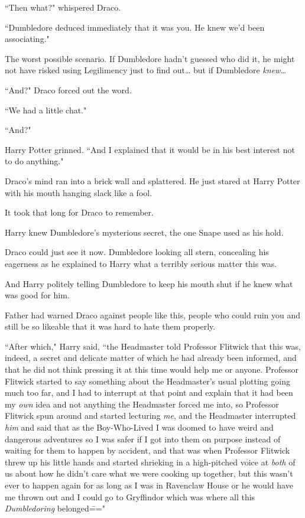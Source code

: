 ``Then what?" whispered Draco.

``Dumbledore deduced immediately that it was you. He knew we'd been associating."

The worst possible scenario. If Dumbledore hadn't guessed who did it, he might not have risked using Legilimency just to find out{\ldots} but if Dumbledore \emph{knew{\ldots}}

``And?" Draco forced out the word.

``We had a little chat."

``And?"

Harry Potter grinned. ``And I explained that it would be in his best interest not to do anything."

Draco's mind ran into a brick wall and splattered. He just stared at Harry Potter with his mouth hanging slack like a fool.

It took that long for Draco to remember.

Harry knew Dumbledore's mysterious secret, the one Snape used as his hold.

Draco could just see it now. Dumbledore looking all stern, concealing his eagerness as he explained to Harry what a terribly serious matter this was.

And Harry politely telling Dumbledore to keep his mouth shut if he knew what was good for him.

Father had warned Draco against people like this, people who could ruin you and still be so likeable that it was hard to hate them properly.

``After which," Harry said, ``the Headmaster told Professor Flitwick that this was, indeed, a secret and delicate matter of which he had already been informed, and that he did not think pressing it at this time would help me or anyone. Professor Flitwick started to say something about the Headmaster's usual plotting going much too far, and I had to interrupt at that point and explain that it had been my \emph{own} idea and not anything the Headmaster forced me into, so Professor Flitwick spun around and started lecturing \emph{me}, and the Headmaster interrupted \emph{him} and said that as the Boy-Who-Lived I was doomed to have weird and dangerous adventures so I was safer if I got into them on purpose instead of waiting for them to happen by accident, and that was when Professor Flitwick threw up his little hands and started shrieking in a high-pitched voice at \emph{both} of us about how he didn't care what we were cooking up together, but this wasn't ever to happen again for as long as I was in Ravenclaw House or he would have me thrown out and I could go to Gryffindor which was where all this \emph{Dumbledoring} belonged\==="

